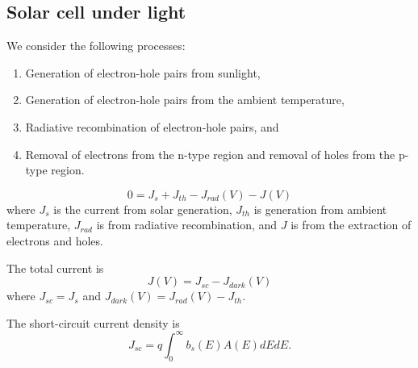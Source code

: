\documentclass[12pt]{article}
\begin{document}
\subsection{Solar cell under light}
We consider the following processes:
\begin{enumerate}
\item Generation of electron-hole pairs from sunlight, 
\item Generation of electron-hole pairs from the ambient temperature,
\item Radiative recombination of electron-hole pairs, and 
\item Removal of electrons from the n-type region and removal of holes from the p-type region.
\end{enumerate}

\begin{equation}
0 = J_s + J_{th} - J_{rad} (V) - J (V)
\end{equation}
where $J_s$ is the current from solar generation, $J_{th}$ is generation from ambient temperature, $J_{rad}$ is from radiative recombination, and $J$ is from the extraction of electrons and holes.  


The total current is 
\begin{equation}
\boxed{J(V) = J_{sc} - J_{dark}(V)}
\end{equation}
where $J_{sc} = J_s $ and $J_{dark}(V) = J_{rad} (V) - J_{th}$.  

The short-circuit current density is 
\begin{equation}
\boxed{J_{sc} = q \int_{0}^{\infty} b_s(E) A(E) dE dE .}
\end{equation}
\end{document}
